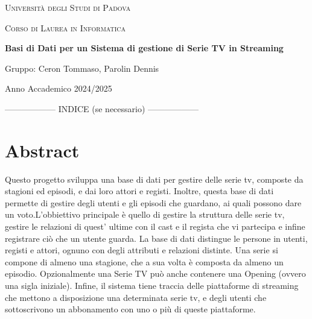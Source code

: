 \documentclass[12pt,a4paper]{article}
\begin{document}
\begin{titlepage}
    \centering
    {\scshape\LARGE Università degli Studi di Padova \par}
    \vspace{1cm}
    {\scshape\Large Corso di Laurea in Informatica \par}
    \vspace{3cm}
    {\Huge\bfseries Basi di Dati per un Sistema di gestione di Serie TV in Streaming \par}
    \vspace{2cm}
    {\Large Gruppo: Ceron Tommaso, Parolin Dennis\par}
    \vfill
    {\large Anno Accademico 2024/2025\par}
\end{titlepage}

------------------ INDICE (se necessario) ------------------
\tableofcontents
\newpage


\section{Abstract}
Questo progetto sviluppa una base di dati per gestire delle serie tv, composte da stagioni ed episodi, e dai loro attori e registi. Inoltre, questa base di dati permette di gestire degli utenti e gli episodi che guardano, ai quali possono dare un voto.\newline L'obbiettivo principale è quello di gestire la struttura delle serie tv, gestire le relazioni di quest’ ultime con il cast e il regista che vi partecipa e infine registrare ciò che un utente guarda.\newline
La base di dati distingue le persone in utenti, registi e attori, ognuno con degli attributi e relazioni distinte.\newline
Una serie si compone di almeno una stagione, che a sua volta è composta da almeno un episodio. Opzionalmente una Serie TV può anche contenere una Opening (ovvero una sigla iniziale).\newline
Infine, il sistema tiene traccia delle piattaforme di streaming che mettono a disposizione una determinata serie tv, e degli utenti che sottoscrivono un abbonamento con uno o più di queste piattaforme. \newline
\end{document}

